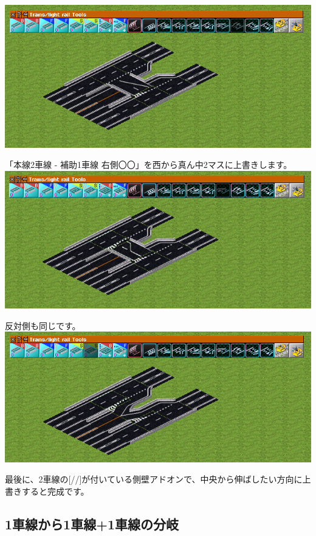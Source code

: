 \documentclass{jbook}
\begin{document}
  \includegraphics[width = 135mm]{picture/20210214-road-1-7.png}

  「本線2車線 - 補助1車線 右側〇〇」を西から真ん中2マスに上書きします。
  \\

  \includegraphics[width = 135mm]{picture/20210214-road-1-8.png}

  反対側も同じです。
  \\

  \includegraphics[width = 135mm]{picture/20210214-road-1-9.png}

  最後に、2車線の[//]が付いている側壁アドオンで、中央から伸ばしたい方向に上書きすると完成です。

\newpage

\subsection{1車線から1車線+1車線の分岐}
\label{sub:1to1and1}
\end{document}
